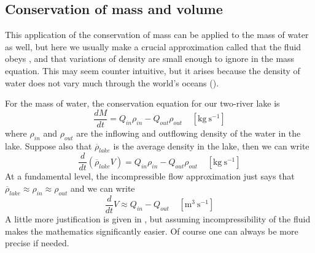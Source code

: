\subsection{Conservation of mass and volume}

This application of the conservation of mass can be applied to the mass of water as well, but here we usually make a crucial approximation called that the fluid obeys , and that variations of density are small enough to ignore in the mass equation.  This may seem counter intuitive, but it arises because the density of water does not vary much through the world's oceans (). 

For the mass of water, the conservation equation for our two-river lake is 
\begin{equation}
    \frac{dM}{dt} = Q_{in}\rho_{in} - Q_{out}\rho_{out}  \ \ \ \ \ \mathrm{\left[kg\ s^{-1}\right]}
\end{equation}
where $\rho_{in}$ and $\rho_{out}$ are the inflowing and outflowing density of the water in the lake.  Suppose also that $\overline{\rho}_{lake}$ is the average density in the lake, then we can write
\begin{equation}
    \frac{d}{dt}\left(\overline{\rho}_{lake} V \right) = Q_{in}\rho_{in} - Q_{out}\rho_{out}  \ \ \ \ \ \mathrm{\left[kg\ s^{-1}\right]}
    \label{eq:Mass}
\end{equation}
At a fundamental level, the incompressible flow approximation just says that $\overline{\rho}_{lake} \approx \rho_{in} \approx \rho_{out}$ and we can write
\begin{equation}
    \frac{d}{dt} V  \approx Q_{in} - Q_{out}  \ \ \ \ \ \mathrm{\left[m^{3}\ s^{-1}\right]}
    \label{eq:Volume}
\end{equation}
A little more justification is given in , but assuming incompressibility of the fluid makes the mathematics significantly easier.  Of course one can always be more precise if needed.  


